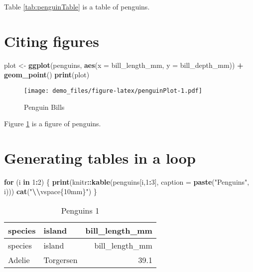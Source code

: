 \documentclass[
]{article}
\newenvironment{Shaded}{\begin{snugshade}}{\end{snugshade}}
\newcommand{\AttributeTok}[1]{\textcolor[rgb]{0.13,0.29,0.53}{#1}}
\newcommand{\ControlFlowTok}[1]{\textcolor[rgb]{0.13,0.29,0.53}{\textbf{#1}}}
\newcommand{\DecValTok}[1]{\textcolor[rgb]{0.00,0.00,0.81}{#1}}
\newcommand{\FunctionTok}[1]{\textcolor[rgb]{0.13,0.29,0.53}{\textbf{#1}}}
\newcommand{\NormalTok}[1]{#1}
\newcommand{\OtherTok}[1]{\textcolor[rgb]{0.56,0.35,0.01}{#1}}
\newcommand{\SpecialCharTok}[1]{\textcolor[rgb]{0.81,0.36,0.00}{\textbf{#1}}}
\newcommand{\StringTok}[1]{\textcolor[rgb]{0.31,0.60,0.02}{#1}}
\begin{document}
Table \ref{tab:penguinTable} is a table of penguins.

\section{Citing figures}\label{citing-figures}

\begin{Shaded}
\begin{Highlighting}[]
\NormalTok{plot }\OtherTok{\textless{}{-}} \FunctionTok{ggplot}\NormalTok{(penguins, }\FunctionTok{aes}\NormalTok{(}\AttributeTok{x =}\NormalTok{ bill\_length\_mm, }\AttributeTok{y =}\NormalTok{ bill\_depth\_mm)) }\SpecialCharTok{+} 
  \FunctionTok{geom\_point}\NormalTok{()}
\FunctionTok{print}\NormalTok{(plot)}
\end{Highlighting}
\end{Shaded}

\begin{figure}
\centering
\texttt{[image: demo\_files/figure-latex/penguinPlot-1.pdf]}
\caption{\label{fig:penguinPlot}Penguin Bills}
\end{figure}

Figure \ref{fig:penguinPlot} is a figure of penguins.

\clearpage

\section{Generating tables in a loop}\label{generating-tables-in-a-loop}

\begin{Shaded}
\begin{Highlighting}[]
\ControlFlowTok{for}\NormalTok{ (i }\ControlFlowTok{in} \DecValTok{1}\SpecialCharTok{:}\DecValTok{2}\NormalTok{)}
\NormalTok{\{}
  \FunctionTok{print}\NormalTok{(knitr}\SpecialCharTok{::}\FunctionTok{kable}\NormalTok{(penguins[i,}\DecValTok{1}\SpecialCharTok{:}\DecValTok{3}\NormalTok{], }\AttributeTok{caption =} \FunctionTok{paste}\NormalTok{(}\StringTok{"Penguins"}\NormalTok{, i)))}
  \FunctionTok{cat}\NormalTok{(}\StringTok{"}\SpecialCharTok{\textbackslash{}\textbackslash{}}\StringTok{vspace\{10mm\}"}\NormalTok{)}
\NormalTok{\}}
\end{Highlighting}
\end{Shaded}

\begin{longtable}[]{@{}llr@{}}
\caption{Penguins 1}\tabularnewline
\toprule\noalign{}
species & island & bill\_length\_mm \\
\midrule\noalign{}
\endfirsthead
\toprule\noalign{}
species & island & bill\_length\_mm \\
\midrule\noalign{}
\endhead
\bottomrule\noalign{}
\endlastfoot
Adelie & Torgersen & 39.1 \\
\end{longtable}
\end{document}
